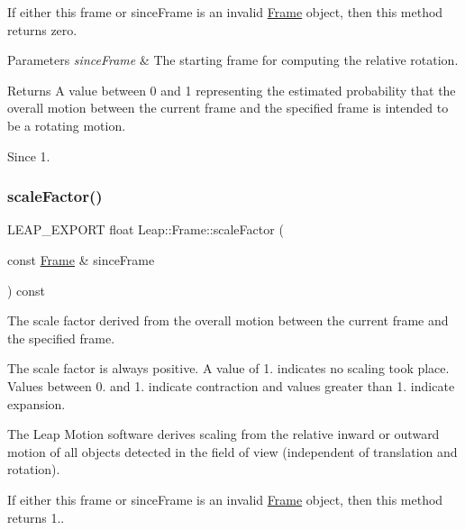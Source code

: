 If either this frame or since\+Frame is an invalid \hyperlink{class_leap_1_1_frame}{Frame} object, then this method returns zero.


\begin{DoxyParams}{Parameters}
{\em since\+Frame} & The starting frame for computing the relative rotation. \\
\hline
\end{DoxyParams}
\begin{DoxyReturn}{Returns}
A value between 0 and 1 representing the estimated probability that the overall motion between the current frame and the specified frame is intended to be a rotating motion. 
\end{DoxyReturn}
\begin{DoxySince}{Since}
1. 
\end{DoxySince}
\mbox{\label{class_leap_1_1_frame_a891200907b954c491432278675c29557}} 
\subsubsection{\texorpdfstring{scale\+Factor()}{scaleFactor()}}
{\footnotesize\ttfamily L\+E\+A\+P\+\_\+\+E\+X\+P\+O\+RT float Leap\+::\+Frame\+::scale\+Factor (\begin{DoxyParamCaption}\item[{const \hyperlink{class_leap_1_1_frame}{Frame} \&}]{since\+Frame }\end{DoxyParamCaption}) const}

The scale factor derived from the overall motion between the current frame and the specified frame.

The scale factor is always positive. A value of 1. indicates no scaling took place. Values between 0. and 1. indicate contraction and values greater than 1. indicate expansion.


\begin{DoxyCodeInclude}
\end{DoxyCodeInclude}


The Leap Motion software derives scaling from the relative inward or outward motion of all objects detected in the field of view (independent of translation and rotation).

If either this frame or since\+Frame is an invalid \hyperlink{class_leap_1_1_frame}{Frame} object, then this method returns 1..


